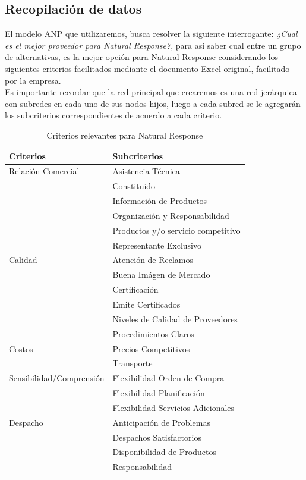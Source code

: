 \documentclass[12pt,letterpaper]{article}
\begin{document}
\subsection{Recopilación de datos}
El modelo ANP que utilizaremos, busca resolver la siguiente interrogante: \textit{¿Cual es el mejor proveedor para Natural Response?}, para así saber cual entre un grupo de alternativas, es la mejor opción para Natural Response considerando los siguientes criterios facilitados mediante el documento Excel original, facilitado por la empresa.\\
Es importante recordar que la red principal que crearemos es una red jerárquica con subredes en cada uno de sus nodos hijos, luego a cada subred se le agregarán los subcriterios correspondientes de acuerdo a cada criterio.

\begin{table}[h]
\centering
\begin{tabular}{|l|l|}
\hline
Criterios & Subcriterios \\
\hline
\multirow{1}{*}{Relación Comercial}
 & Asistencia Técnica \\
 & Constituido \\
 & Información de Productos \\
 & Organización y Responsabilidad \\
 & Productos y/o servicio competitivo \\
 & Representante Exclusivo\\
\hline
\multirow{1}{*}{Calidad}
 & Atención de Reclamos \\
 & Buena Imágen de Mercado \\
 & Certificación \\
 & Emite Certificados \\
 & Niveles de Calidad de Proveedores \\
 & Procedimientos Claros\\
\hline
\multirow{1}{*}{Costos}
 & Precios Competitivos \\
 & Transporte \\
\hline
\multirow{1}{*}{Sensibilidad/Comprensión}
 & Flexibilidad Orden de Compra \\
 & Flexibilidad Planificación \\
 & Flexibilidad Servicios Adicionales \\ 
\hline
\multirow{1}{*}{Despacho}
 & Anticipación de Problemas \\
 & Despachos Satisfactorios \\
 & Disponibilidad de Productos \\ 
 & Responsabilidad \\
\hline
\end{tabular}
\caption{Criterios relevantes para Natural Response}
\label{tab:criterios}
\end{table}
\newpage
\end{document}
